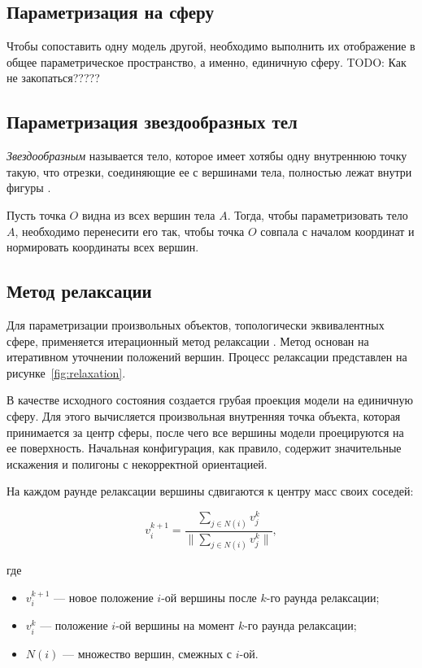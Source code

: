     \subsection{Параметризация на сферу}
    Чтобы сопоставить одну модель другой, необходимо выполнить их отображение в общее параметрическое пространство, а именно, единичную сферу. TODO: Как не закопаться?????
    
	\subsection{Параметризация звездообразных тел}
	\textit{Звездообразным} называется тело, которое имеет хотябы одну внутреннюю точку такую, что отрезки, соединяющие ее с вершинами тела, полностью лежат внутри фигуры \cite{alexa}.
	   
   Пусть точка $O$ видна из всех вершин тела $A$. Тогда, чтобы параметризовать тело $A$, необходимо перенесити его так, чтобы точка $O$ совпала с началом координат и нормировать координаты всех вершин.

	\subsection{Метод релаксации}
	Для параметризации произвольных объектов, топологически эквивалентных сфере, применяется итерационный метод релаксации \cite{alexa}. Метод основан на итеративном уточнении положений вершин.
	Процесс релаксации представлен на рисунке~\ref{fig:relaxation}. 
	
	В качестве исходного состояния создается грубая проекция модели на единичную сферу. Для этого вычисляется произвольная внутренняя точка объекта, которая принимается за центр сферы, после чего все вершины модели проецируются на ее поверхность. Начальная конфигурация, как правило, содержит значительные искажения и полигоны с некорректной ориентацией.
	
	На каждом раунде релаксации вершины сдвигаются к центру масс своих соседей:
	
	\begin{equation}
		v_i^{k + 1} = \frac{\sum_{j \in N(i)} v_j^{k}}{\parallel \sum_{j \in N(i)} v_j^{k} \parallel}, 
	\end{equation}
	
	где
	\begin{itemize}
		\item $v_i^{k + 1}$ --- новое положение $i$-ой вершины после $k$-го раунда релаксации;
		\item $v_i^{k}$ --- положение $i$-ой вершины на момент $k$-го раунда релаксации;
		\item $N(i)$ --- множество вершин, смежных с $i$-ой.
	\end{itemize}
	
